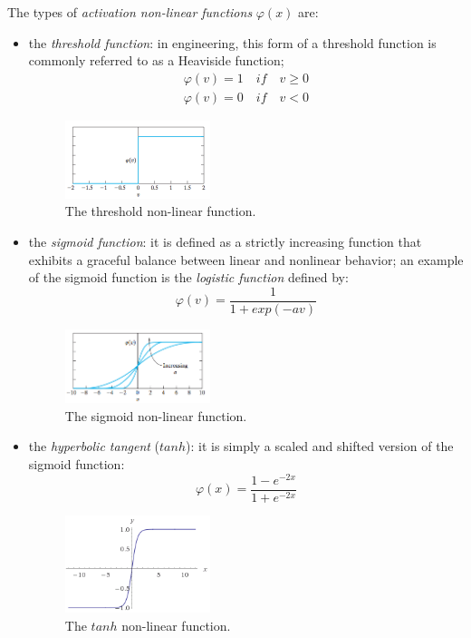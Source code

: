 The types of \textit{activation non-linear functions} $\varphi(x)$ are:
\begin{itemize}

\item the \textit{threshold function}: in engineering, this form of a threshold function is commonly referred to as a Heaviside function;
\begin{eqnarray}
\varphi \left( v \right) =1\quad if\quad v\ge 0 \\ 
\varphi \left( v \right) =0\quad if\quad v<0
\end{eqnarray}
\begin{figure}
\centering
\includegraphics[width=0.4\textwidth]{img/Heaviside}
\caption{The threshold non-linear function.}
\end{figure}

\item the \textit{sigmoid function}: it is defined as a strictly increasing function that exhibits a graceful balance between linear and nonlinear behavior; an example of the sigmoid function is the \textit{logistic function} defined by:
\begin{equation}
\varphi \left( v \right) =\frac { 1 }{ 1+exp\left( -av \right)  } 
\end{equation}
\begin{figure}
\centering
\includegraphics[width=0.4\textwidth]{img/sigmoid}
\caption{The sigmoid non-linear function.}
\end{figure}

\item the \textit{ hyperbolic tangent } ($tanh$): it is simply a scaled and shifted version of the sigmoid function:
\begin{equation}
\varphi(x) = \frac{1-e^{-2x}}{1+e^{-2x}}
\end{equation}
\begin{figure}[t]
\centering
	\includegraphics[width=0.4\textwidth]{img/tanh}
	\caption{The $tanh$ non-linear function.}
\end{figure}


\end{itemize}
